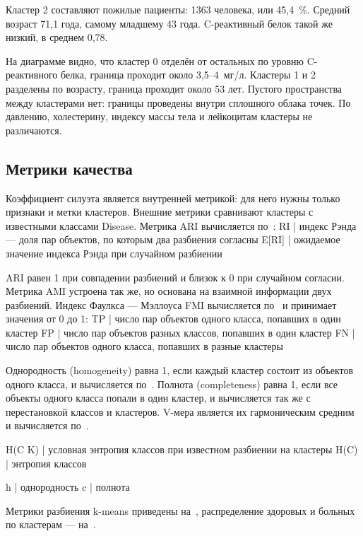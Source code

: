 \documentclass[a4paper,14pt]{extarticle}
\begin{document}
Кластер 2 составляют пожилые пациенты: 1363 человека, или 45,4~\%. Средний возраст 71,1 года, самому младшему 43 года. C-реактивный белок такой же низкий, в среднем 0,78.

На диаграмме видно, что кластер 0 отделён от остальных по уровню C-реактивного белка, граница проходит около 3,5–4~мг/л. Кластеры 1 и 2 разделены по возрасту, граница проходит около 53 лет. Пустого пространства между кластерами нет: границы проведены внутри сплошного облака точек. По давлению, холестерину, индексу массы тела и лейкоцитам кластеры не различаются.

\subsection{Метрики качества}

Коэффициент силуэта является внутренней метрикой: для него нужны только признаки и метки кластеров. Внешние метрики сравнивают кластеры с известными классами Disease. Метрика ARI вычисляется по~:
RI | индекс Рэнда — доля пар объектов, по которым два разбиения согласны
E[RI] | ожидаемое значение индекса Рэнда при случайном разбиении

ARI равен 1 при совпадении разбиений и близок к 0 при случайном согласии. Метрика AMI устроена так же, но основана на взаимной информации двух разбиений. Индекс Фаулкса — Мэллоуса FMI вычисляется по~ и принимает значения от 0 до 1:
TP | число пар объектов одного класса, попавших в один кластер
FP | число пар объектов разных классов, попавших в один кластер
FN | число пар объектов одного класса, попавших в разные кластеры

Однородность (homogeneity) равна 1, если каждый кластер состоит из объектов одного класса, и вычисляется по~. Полнота (completeness) равна 1, если все объекты одного класса попали в один кластер, и вычисляется так же с перестановкой классов и кластеров. V-мера является их гармоническим средним и вычисляется по~.

H(C \mid K) | условная энтропия классов при известном разбиении на кластеры
H(C) | энтропия классов

h | однородность
c | полнота

Метрики разбиения k-means приведены на~, распределение здоровых и больных по кластерам — на~.
\end{document}
